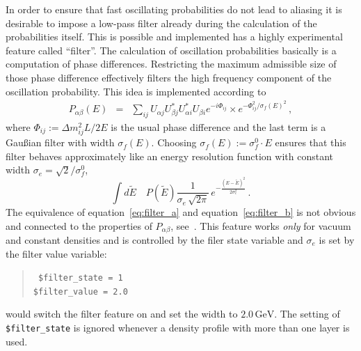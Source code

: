 In order to ensure that fast oscillating probabilities do not lead to 
aliasing
it is desirable to impose a low-pass filter already during the calculation
of the probabilities itself. This is possible and implemented has a highly
experimental feature called ``filter''. 
The calculation of oscillation
probabilities basically is a computation of phase differences. Restricting
the maximum admissible size of those phase difference effectively filters
the high frequency component of the oscillation probability. This idea is
implemented according to
\begin{eqnarray}
\label{eq:filter_a}
P_{\alpha\beta}(E)&=&\sum_{ij}
U_{\alpha j} U^*_{\beta j} U^*_{\alpha i} U_{\beta i} 
e^{-i\Phi_{ij}}\times 
e^{ -\Phi_{ij}^2/\sigma_f(E)^2 }\,,
\end{eqnarray}
where $\Phi_{ij}:=\Delta m_{ij}^2 L/2E$ is the usual phase difference and
the last term is a Gau\ss ian filter with width $\sigma_f(E)$. Choosing
$\sigma_f(E):=\sigma_f^0 \cdot E$ ensures that this filter behaves 
approximately like an energy resolution function with constant width 
$\sigma_e=\sqrt{2}/\sigma_f^0$, \ie\
\begin{equation}
\label{eq:filter_b}
\int d\tilde E\quad P(\tilde E) \frac{1}{\sigma_e\,\sqrt{2\pi}}\,
e^{-\frac{(E-\tilde E)^2}{2\sigma^2_e}}\,.
\end{equation}
The equivalence of equation~\ref{eq:filter_a} and equation~\ref{eq:filter_b}
is not obvious and connected to the properties of $P_{\alpha\beta}$, 
see~\cite{Kiers:1996zj,Giunti:2003ax}. This feature works \emph{only} 
for vacuum and constant densities and is controlled
by the filer state variable and $\sigma_e$ is set by the filter value 
variable:
\begin{quote}
{\tt
\$filter\_state = 1\\
\$filter\_value = 2.0\\
}
\end{quote}
would switch the filter feature on and set the width to $2.0\,\mathrm{GeV}$.
The setting of {\tt \$filter\_state} is ignored whenever a density profile
with more than one layer is used. 

